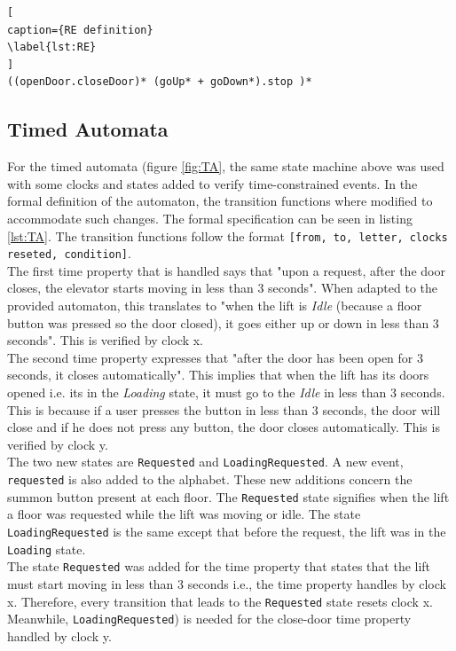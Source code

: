 \documentclass[a4paper, 12pt]{article}
\begin{document}
\begin{lstlisting}[
caption={RE definition}
\label{lst:RE}
]
((openDoor.closeDoor)* (goUp* + goDown*).stop )*

\end{lstlisting}


\subsection{Timed Automata}
\label{sec:timed-automata}
For the timed automata (figure \ref{fig:TA}, the same state machine above was used with some clocks and states added to verify time-constrained events. In the formal definition of the automaton, the transition functions where modified to accommodate such changes. The formal specification can be seen in listing \ref{lst:TA}. The transition functions follow the format \texttt{[from, to, letter, clocks reseted, condition]}. \\

The first time property that is handled says that "upon a request, after the door closes, the elevator starts moving in less than 3 seconds". When adapted to the provided automaton, this translates to "when the lift is \textit{Idle} (because a floor button was pressed so the door closed), it goes either up or down in less than 3 seconds". This is verified by clock x. \\

The second time property expresses that "after the door has been open for 3 seconds, it closes automatically". This implies that when the lift has its doors opened i.e. its in the \textit{Loading} state, it must go to the \textit{Idle} in less than 3 seconds. This is because if a user presses the button in less than 3 seconds, the door will close and if he does not press any button, the door closes automatically. This is verified by clock y.  \\

The two new states are \texttt{Requested} and \texttt{LoadingRequested}. A new event, \texttt{requested} is also added to the alphabet. These new additions concern the summon button present at each floor. The \texttt{Requested} state signifies when the lift a floor was requested while the lift was moving or idle. The state \texttt{LoadingRequested} is the same except that before the request, the lift was in the \texttt{Loading} state. \\

The state \texttt{Requested} was added for the time property that states that the lift must start moving in less than 3 seconds i.e., the time property handles by clock x. Therefore, every transition that leads to the \texttt{Requested} state resets clock x. Meanwhile, \texttt{LoadingRequested}) is needed for the close-door time property handled by clock y. 
\end{document}
